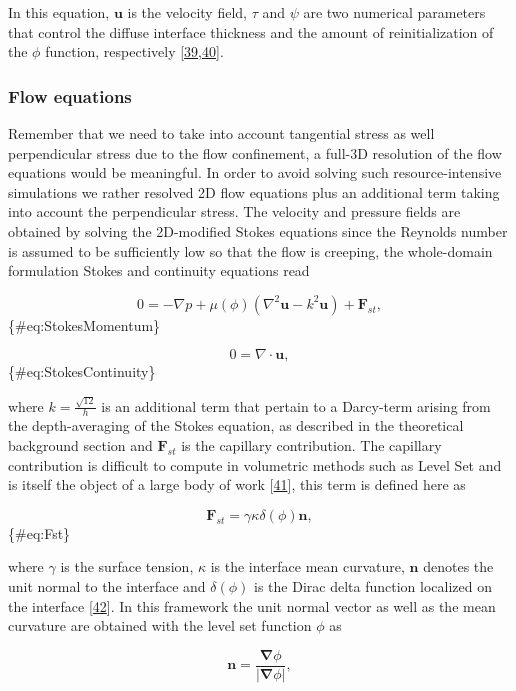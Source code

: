 \documentclass[]{article}
\begin{document}
In this equation, \(\mathbf{u}\) is the velocity field, \(\tau\) and
\(\psi\) are two numerical parameters that control the diffuse interface
thickness and the amount of reinitialization of the \(\phi\) function,
respectively
{[}\protect\hyperlink{ref-Olsson2005}{39},\protect\hyperlink{ref-Olsson2007}{40}{]}.

\hypertarget{flow-equations}{%
\subsubsection{Flow equations}\label{flow-equations}}

Remember that we need to take into account tangential stress as well
perpendicular stress due to the flow confinement, a full-3D resolution
of the flow equations would be meaningful. In order to avoid solving
such resource-intensive simulations we rather resolved 2D flow equations
plus an additional term taking into account the perpendicular stress.
The velocity and pressure fields are obtained by solving the 2D-modified
Stokes equations since the Reynolds number is assumed to be sufficiently
low so that the flow is creeping, the whole-domain formulation Stokes
and continuity equations read

\[
0=-\nabla p+\mu(\phi)\left(\nabla^{2}\mathbf{u}-k^{2}\mathbf{u}\right)+\mathbf{F}_{st},
\] \{\#eq:StokesMomentum\}

\[
0=\nabla\cdot\mathbf{u},
\] \{\#eq:StokesContinuity\}

where \(k=\frac{\sqrt{12}}{h}\) is an additional term that pertain to a
Darcy-term arising from the depth-averaging of the Stokes equation, as
described in the theoretical background section and \(\mathbf{F}_{st}\)
is the capillary contribution. The capillary contribution is difficult
to compute in volumetric methods such as Level Set and is itself the
object of a large body of work
{[}\protect\hyperlink{ref-Popinet2018}{41}{]}, this term is defined here
as

\[
\mathbf{F}_{st}=\gamma\kappa\delta(\phi)\mathbf{n},
\] \{\#eq:Fst\}

where \(\gamma\) is the surface tension, \(\kappa\) is the interface
mean curvature, \(\mathbf{n}\) denotes the unit normal to the interface
and \(\delta(\phi)\) is the Dirac delta function localized on the
interface {[}\protect\hyperlink{ref-Galusinski2008}{42}{]}. In this
framework the unit normal vector as well as the mean curvature are
obtained with the level set function \(\phi\) as

\[
\mathbf{n}=\frac{\boldsymbol{\nabla}\phi}{\vert\boldsymbol{\nabla}\phi\vert},
\]
\end{document}
